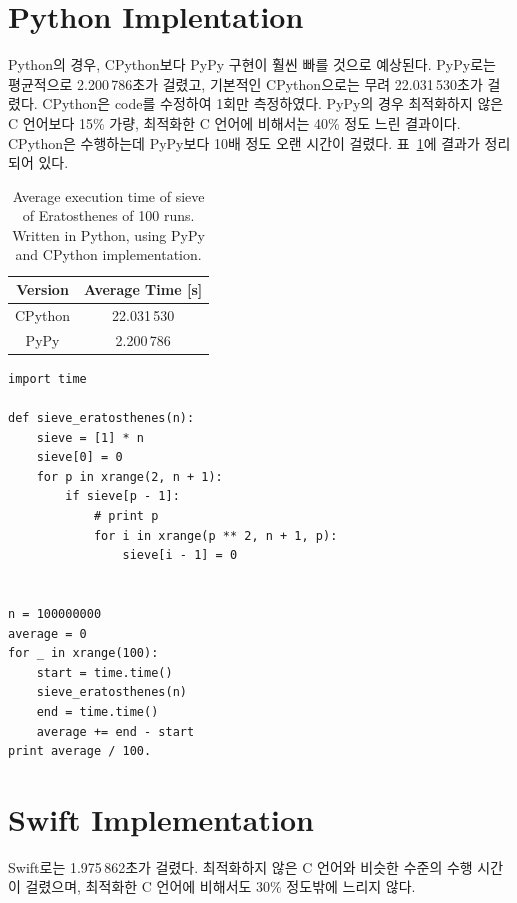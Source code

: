 \documentclass[a4paper, 10pt]{oblivoir}
\theoremstyle{definition}
\begin{document}
\section{Python Implentation}

Python의 경우, CPython보다 PyPy 구현이 훨씬 빠를 것으로 예상된다.
PyPy로는 평균적으로 2.200\,786초가 걸렸고, 기본적인 CPython으로는 무려 22.031\,530초가 걸렸다.
CPython은 code를 수정하여 1회만 측정하였다.
PyPy의 경우 최적화하지 않은 C 언어보다 15\% 가량, 최적화한 C 언어에 비해서는 40\% 정도 느린 결과이다.
CPython은 수행하는데 PyPy보다 10배 정도 오랜 시간이 걸렸다.
표~\ref{tab:python}에 결과가 정리되어 있다.

\begin{table}[H]
\centering
\caption{Average execution time of sieve of Eratosthenes of 100 runs. Written in Python, using PyPy and CPython implementation.}
\label{tab:python}
\begin{tabular}{@{}cc@{}}
\toprule
\textbf{Version} & \textbf{Average Time [s]} \\ \midrule
CPython    & 22.031\,530                  \\
PyPy    & 2.200\,786                  \\ \bottomrule
\end{tabular}
\end{table}

\begin{verbatim}
import time

def sieve_eratosthenes(n):
    sieve = [1] * n
    sieve[0] = 0
    for p in xrange(2, n + 1):
        if sieve[p - 1]:
            # print p
            for i in xrange(p ** 2, n + 1, p):
                sieve[i - 1] = 0


n = 100000000
average = 0
for _ in xrange(100):
    start = time.time()
    sieve_eratosthenes(n)
    end = time.time()
    average += end - start
print average / 100.
\end{verbatim}

\section{Swift Implementation}

Swift로는 1.975\,862초가 걸렸다.
최적화하지 않은 C 언어와 비슷한 수준의 수행 시간이 걸렸으며, 최적화한 C 언어에 비해서도 30\% 정도밖에 느리지 않다.
\end{document}
